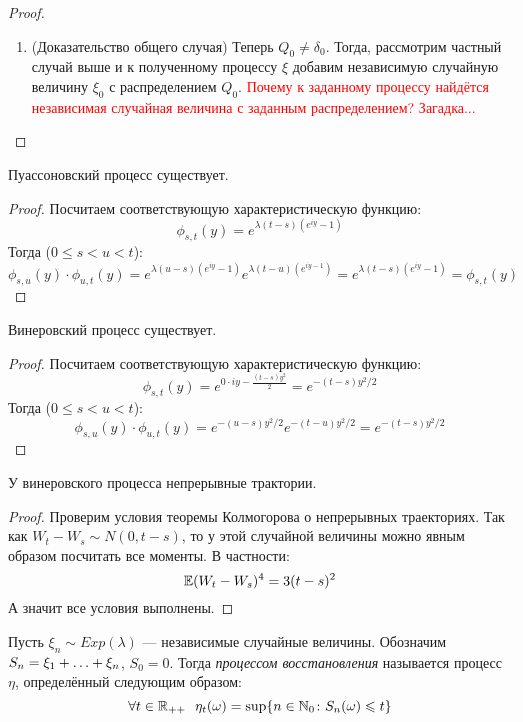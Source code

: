 \begin{proof}
\begin{itemize}
\begin{enumerate}
			\item (Доказательство общего случая) Теперь $Q_0 \neq \delta_0$. Тогда, рассмотрим частный случай выше и к полученному процессу $\xi$ добавим независимую случайную величину $\xi_0$ с распределением $Q_0$. \textcolor{red}{Почему к заданному процессу найдётся независимая случайная величина с заданным распределением? Загадка...}
		\end{enumerate}
	\end{itemize}
\end{proof}

\begin{corollary}
	Пуассоновский процесс существует.
\end{corollary}

\begin{proof}
	Посчитаем соответствующую характеристическую функцию:
	\[
		\phi_{s, t}(y) = e^{\lambda(t - s)(e^{iy} - 1)}
	\]
	Тогда ($0 \le s < u < t$):
	\[
		\phi_{s, u}(y) \cdot \phi_{u, t}(y) = e^{\lambda(u - s)(e^{iy} - 1)} e^{\lambda(t - u)(e^{iy - 1})} = e^{\lambda(t - s)(e^{iy} - 1)} = \phi_{s, t}(y)
	\]
\end{proof}

\begin{corollary}
	Винеровский процесс существует.
\end{corollary}

\begin{proof}
	Посчитаем соответствующую характеристическую функцию:
	\[
		\phi_{s, t}(y) = e^{0 \cdot iy - \frac{(t - s)y^2}{2}} = e^{-(t - s)y^2 / 2}
	\]
	Тогда ($0 \le s < u < t$):
	\[
		\phi_{s, u}(y) \cdot \phi_{u, t}(y) = e^{-(u - s)y^2 / 2}e^{-(t - u)y^2 / 2} = e^{-(t - s)y^2 / 2}
	\]
\end{proof}

\begin{proposition}
	У винеровского процесса непрерывные трактории.
\end{proposition}

\begin{proof}
	Проверим условия теоремы Колмогорова о непрерывных траекториях. Так как $W_t - W_s \sim N(0, t - s)$, то у этой случайной величины можно явным образом посчитать все моменты. В частности:
	\[
		\mathbb{E} (W_t - W_s)^4 = 3(t - s)^2
	\]
	А значит все условия выполнены.
\end{proof}

\begin{definition}
	Пусть $\xi_n \sim Exp(\lambda)$ --- независимые случайные величины. Обозначим $S_n = \xi_1 + \ldots + \xi_n$, $S_0 = 0$. Тогда \textit{процессом восстановления} называется процесс $\eta$, определённый следующим образом:
	\[
		\forall t \in \mathbb{R}_{++}\ \ \eta_t(\omega) = \sup \{n \in \mathbb{N}_0 \colon S_n(\omega) \leqslant t\}
	\]
\end{definition}


